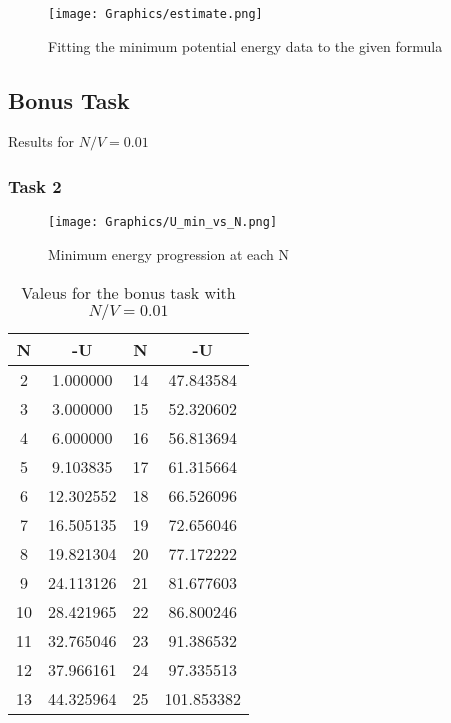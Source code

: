 \documentclass{scrartcl}
\begin{document}
    \begin{figure}[h!]
        \centering
        \texttt{[image: Graphics/estimate.png]}
        \caption{Fitting the minimum potential energy data to the given formula}
        \label{fig:my_label 6}
    \end{figure}
    
\newpage

\subsection{Bonus Task}
\par Results for $N/V=0.01$
\subsubsection{Task 2}

    \begin{figure}[h!]
        \centering
        \texttt{[image: Graphics/U\_min\_vs\_N.png]}
        \caption{Minimum energy progression at each N}
        \label{fig:my_label 6}
    \end{figure}

    \begin{table} [h]
    \centering
    \label{tab:table1}
 
    \begin{tabular}{|c|c|c|c|}
    \hline
   N      &  -U       &   N    &  -U \\
   \hline
    2     &  1.000000  &   14  &  47.843584\\
    3     &  3.000000  &   15  &  52.320602\\
    4     &  6.000000  &   16  &  56.813694\\
    5     &  9.103835 &   17  &  61.315664\\
    6     &  12.302552 &   18  &  66.526096\\
    7     &  16.505135 &   19  &  72.656046\\
    8     &  19.821304 &   20  &  77.172222\\
    9     &  24.113126 &   21  &  81.677603\\
    10    &  28.421965 &   22  &  86.800246\\
    11    &  32.765046 &   23  &  91.386532\\
    12    &  37.966161 &   24  &  97.335513\\
    13    &  44.325964 &   25  &  101.853382\\      
    \hline           
    \end{tabular}
    \caption{Valeus for the bonus task with $N/V=0.01$} \cite{GOLJC}
\end{table}
\end{document}
